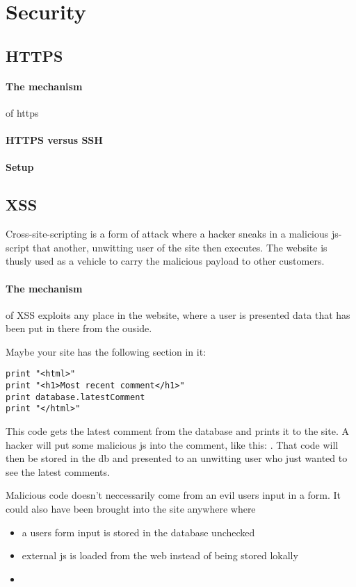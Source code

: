 \section{Security}

\subsection{HTTPS}

\paragraph{The mechanism} of https 

\paragraph{HTTPS versus SSH}

\paragraph{Setup}


\subsection{XSS}

Cross-site-scripting is a form of attack where a hacker sneaks in a malicious js-script that another, unwitting user of the site then executes. The website is thusly used as a vehicle to carry the malicious payload to other customers. 

\paragraph{The mechanism} of XSS exploits any place in the website, where a user is presented data that has been put in there from the ouside. 

Maybe your site has the following section in it: 
\begin{lstlisting}
print "<html>"
print "<h1>Most recent comment</h1>"
print database.latestComment
print "</html>"
\end{lstlisting}
This code gets the latest comment from the database and prints it to the site. 
A hacker will put some malicious js into the comment, like this: . That code will then be stored in the db and presented to an unwitting user who just wanted to see the latest comments.  

Malicious code doesn't neccessarily come from an evil users input in a form. It could also have been brought into the site anywhere where 
\begin{itemize}
    \item a users form input is stored in the database unchecked
    \item external js is loaded from the web instead of being stored lokally
    \item 
\end{itemize}

